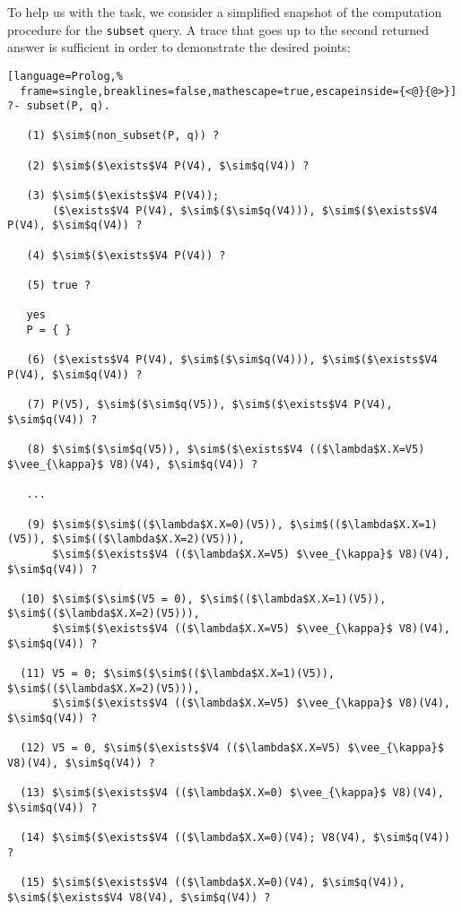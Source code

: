 \documentclass[inscr,ack,preface]{dithesis}
\theoremstyle{definition}
\begin{document}
To help us with the task, we consider a simplified snapshot of the computation procedure for the \texttt{subset} query. A trace that goes up to the second returned answer is sufficient in order to demonstrate the desired points:
\\
\begin{lstlisting}[language=Prolog,%
  frame=single,breaklines=false,mathescape=true,escapeinside={<@}{@>}]
?- subset(P, q).

   (1) $\sim$(non_subset(P, q)) ?

   (2) $\sim$($\exists$V4 P(V4), $\sim$q(V4)) ?

   (3) $\sim$($\exists$V4 P(V4));
       ($\exists$V4 P(V4), $\sim$($\sim$q(V4))), $\sim$($\exists$V4 P(V4), $\sim$q(V4)) ?

   (4) $\sim$($\exists$V4 P(V4)) ?

   (5) true ?

   yes
   P = { }

   (6) ($\exists$V4 P(V4), $\sim$($\sim$q(V4))), $\sim$($\exists$V4 P(V4), $\sim$q(V4)) ?

   (7) P(V5), $\sim$($\sim$q(V5)), $\sim$($\exists$V4 P(V4), $\sim$q(V4)) ?

   (8) $\sim$($\sim$q(V5)), $\sim$($\exists$V4 (($\lambda$X.X=V5) $\vee_{\kappa}$ V8)(V4), $\sim$q(V4)) ?

   ...

   (9) $\sim$($\sim$(($\lambda$X.X=0)(V5)), $\sim$(($\lambda$X.X=1)(V5)), $\sim$(($\lambda$X.X=2)(V5))),
       $\sim$($\exists$V4 (($\lambda$X.X=V5) $\vee_{\kappa}$ V8)(V4), $\sim$q(V4)) ?

  (10) $\sim$($\sim$(V5 = 0), $\sim$(($\lambda$X.X=1)(V5)), $\sim$(($\lambda$X.X=2)(V5))),
       $\sim$($\exists$V4 (($\lambda$X.X=V5) $\vee_{\kappa}$ V8)(V4), $\sim$q(V4)) ?

  (11) V5 = 0; $\sim$($\sim$(($\lambda$X.X=1)(V5)), $\sim$(($\lambda$X.X=2)(V5))),
       $\sim$($\exists$V4 (($\lambda$X.X=V5) $\vee_{\kappa}$ V8)(V4), $\sim$q(V4)) ?

  (12) V5 = 0, $\sim$($\exists$V4 (($\lambda$X.X=V5) $\vee_{\kappa}$ V8)(V4), $\sim$q(V4)) ?

  (13) $\sim$($\exists$V4 (($\lambda$X.X=0) $\vee_{\kappa}$ V8)(V4), $\sim$q(V4)) ?

  (14) $\sim$($\exists$V4 (($\lambda$X.X=0)(V4); V8(V4), $\sim$q(V4)) ?

  (15) $\sim$($\exists$V4 (($\lambda$X.X=0)(V4), $\sim$q(V4)), $\sim$($\exists$V4 V8(V4), $\sim$q(V4)) ?


\end{lstlisting}
\end{document}

